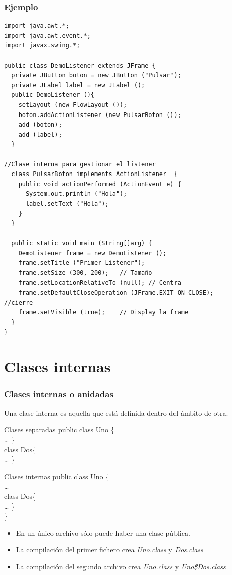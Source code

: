 \documentclass{beamer}
\begin{document}
\begin{frame}[fragile]
    \frametitle{Ejemplo}
\begin{tiny}
\begin{verbatim}
import java.awt.*;
import java.awt.event.*;
import javax.swing.*;

public class DemoListener extends JFrame {
  private JButton boton = new JButton ("Pulsar");
  private JLabel label = new JLabel ();
  public DemoListener (){
    setLayout (new FlowLayout ());
    boton.addActionListener (new PulsarBoton ());
    add (boton);
    add (label);
  }
  
//Clase interna para gestionar el listener
  class PulsarBoton implements ActionListener  {
    public void actionPerformed (ActionEvent e) {
      System.out.println ("Hola");
      label.setText ("Hola");
    }
  }
  
  public static void main (String[]arg) {
    DemoListener frame = new DemoListener ();
    frame.setTitle ("Primer Listener");
    frame.setSize (300, 200);   // Tamaño
    frame.setLocationRelativeTo (null); // Centra
    frame.setDefaultCloseOperation (JFrame.EXIT_ON_CLOSE);      //cierre
    frame.setVisible (true);    // Display la frame
  }
}
\end{verbatim}
\end{tiny}
\end{frame}

\section{Clases internas}
\begin{frame}[fragile]
    \frametitle{Clases internas o anidadas}
 Una clase interna es aquella que está definida dentro del ámbito de otra.
\begin{multicols}{2}
\begin{block}{Clases separadas}
public class Uno \{\\
\dots
\}\\
class Dos\{\\
\dots
\}
\end{block}
\begin{block}{Clases internas}
public class Uno \{\\
\dots\\
class Dos\{\\
\dots
\}\\
\}\\
\end{block}
\end{multicols}
\pause
\begin{itemize}[<+->]
\item En un único archivo sólo puede haber una clase pública.
\item La compilación del primer fichero crea \emph{Uno.class} y \emph{Dos.class}
\item La compilación del segundo archivo crea \emph{Uno.class} y \emph{Uno\$Dos.class}
\end{itemize}
\end{frame}
\end{document}
